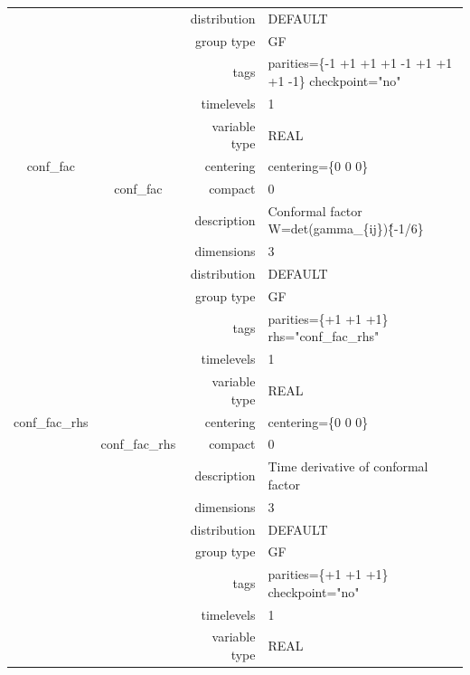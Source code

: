 \begin{tabular*}{150mm}{|c|c@{\extracolsep{\fill}}|rl|}
 &  & distribution & DEFAULT \\ 
 &  & group type & GF \\ 
 &  & tags & parities=\{-1 +1 +1  +1 -1 +1  +1 +1 -1\} checkpoint="no" \\ 
 &  & timelevels & 1 \\ 
 &  & variable type & REAL \\ 
\hline 
conf\_fac &  & centering & centering=\{0 0 0\} \\ 
 & conf\_fac & compact & 0 \\ 
 &  & description & Conformal factor W=det(gamma\_\{ij\})\^\{-1/6\} \\ 
 &  & dimensions & 3 \\ 
 &  & distribution & DEFAULT \\ 
 &  & group type & GF \\ 
 &  & tags & parities=\{+1 +1 +1\} rhs="conf\_fac\_rhs" \\ 
 &  & timelevels & 1 \\ 
 &  & variable type & REAL \\ 
\hline 
conf\_fac\_rhs &  & centering & centering=\{0 0 0\} \\ 
 & conf\_fac\_rhs & compact & 0 \\ 
 &  & description & Time derivative of conformal factor \\ 
 &  & dimensions & 3 \\ 
 &  & distribution & DEFAULT \\ 
 &  & group type & GF \\ 
 &  & tags & parities=\{+1 +1 +1\} checkpoint="no" \\ 
 &  & timelevels & 1 \\ 
 &  & variable type & REAL \\ 
\hline 
\end{tabular*} 



\vspace{5mm}
\vspace{5mm}

